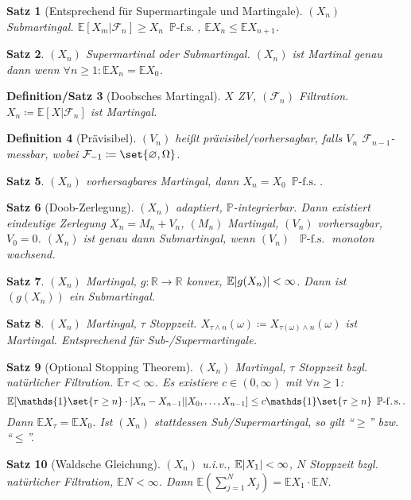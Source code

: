 \documentclass[a4paper,8pt]{article}
\newcounter{Sec}
\theoremstyle{nonumberbreak}
\newtheorem{definition}{Definition}[Sec]
\newtheorem{satz}[definition]{Satz}
\newtheorem{defsatz}[definition]{Definition/Satz}
\newcommand{\defas}{\coloneqq}
\newcommand{\ind}{\mathds{1}}
\renewcommand{\P}{\mathbb{P}}
\newcommand{\R}{\mathbb{R}}
\newcommand{\F}{\mathcal{F}}
\newcommand{\E}{\mathbb{E}}
\newcommand{\EV}[2]{\E[#1|#2]}
\newcommand{\fs}[1]{~\operatorname{#1-f.s.}}
\begin{document}
\begin{multicols}{3}
\begin{satz}[Entsprechend für Supermartingale und Martingale]
		$(X_n)$ Submartingal. $\EV{X_m}{\F_n}\geq X_n\fs\P$, $\E X_n\leq \E X_{n+1}$.
	\end{satz}
	\begin{satz}
		$(X_n)$ Supermartinal oder Submartingal. $(X_n)$ ist Martinal genau dann wenn
		$\forall n\geq 1:\E X_n = \E X_0$.
	\end{satz}
	\begin{defsatz}[Doobsches Martingal]
		$X$ ZV, $(\F_n)$ Filtration. $X_n\defas\EV{X}{\F_n}$ ist Martingal.
	\end{defsatz}
	\begin{definition}[Prävisibel]
		$(V_n)$ heißt prävisibel/vorhersagbar, falls $V_n$ $\F_{n-1}$-messbar,
		wobei $\F_{-1}\defas\set{\varnothing,\Omega}$.
	\end{definition}
	\begin{satz}
		$(X_n)$ vorhersagbares Martingal, dann $X_n=X_0\fs\P$.
	\end{satz}
	\begin{satz}[Doob-Zerlegung]
		$(X_n)$ adaptiert, $\P$-integrierbar. Dann existiert eindeutige Zerlegung
		$X_n=M_n+V_n$, $(M_n)$ Martingal, $(V_n)$ vorhersagbar, $V_0=0$.
		$(X_n)$ ist genau dann Submartingal, wenn $(V_n)$ $\fs\P$ monoton wachsend.
	\end{satz}
	\begin{satz}
		$(X_n)$ Martingal, $g\colon\R\to\R$ konvex, $\E\abs{g(X_n)}<\infty$. Dann
		ist $(g(X_n))$ ein Submartingal.
	\end{satz}
	\begin{satz}
		$(X_n)$ Martingal, $\tau$ Stoppzeit. $X_{\tau\wedge n}(\omega)\defas X_{\tau(\omega)\wedge n}(\omega)$
		ist Martingal. Entsprechend für Sub-/Supermartingale.
	\end{satz}
	\begin{satz}[Optional Stopping Theorem]
		$(X_n)$ Martingal, $\tau$ Stoppzeit bzgl. natürlicher Filtration. $\E\tau<\infty$.
		Es existiere $c\in(0,\infty)$ mit $\forall n\geq 1$:
		\[
			\EV{\ind\set{\tau\geq n}\cdot\abs{X_n-X_{n-1}}}{X_0,\ldots,X_{n-1}}\leq c\ind\set{\tau\geq n}\fs\P.
		\]
		Dann $\E X_\tau = \E X_0$. Ist $(X_n)$ stattdessen Sub/Supermartingal, so
		gilt \enquote{$\geq$} bzw. \enquote{$\leq$}.
	\end{satz}
	\begin{satz}[Waldsche Gleichung]
		$(X_n)$ u.i.v., $\E\abs{X_1}<\infty$, $N$ Stoppzeit bzgl. natürlicher Filtration,
		$\E N<\infty$. Dann $\E(\sum_{j=1}^N X_j) = \E X_1\cdot \E N$.
	\end{satz}

\end{multicols}
\end{document}
